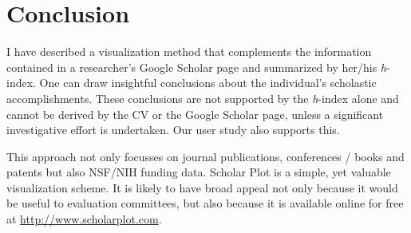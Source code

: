 \chapter{Conclusion}\label{chap:Conclusion}

I have described a visualization method that complements the information contained in a researcher's Google Scholar page and summarized by her/his {\it h}-index. One can draw insightful conclusions about the individual's scholastic accomplishments. These conclusions are not supported by the {\it h}-index alone and cannot be derived by the CV or the Google Scholar page, unless a significant investigative effort is undertaken. Our user study also supports this.

This approach not only focusses on journal publications, conferences / books and patents but also NSF/NIH funding data. Scholar Plot is a simple, yet valuable visualization scheme. It is likely to have broad appeal not only because it would be useful to evaluation committees, but also because it is available online for free at \url{http://www.scholarplot.com}. 

